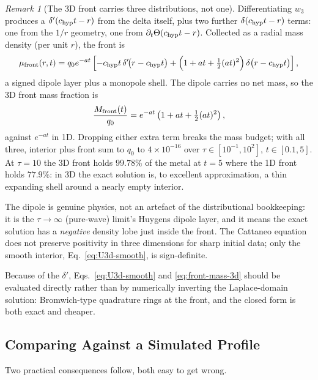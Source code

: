 \documentclass[11pt, a4paper, parskip]{scrartcl}
\theoremstyle{plain}
\theoremstyle{definition}
\theoremstyle{remark}
\newtheorem{remark}{Remark}
\newcommand{\chyp}{c_{\rm hyp}}                           %
\newcommand{\taurelax}{\tau}                              %
\begin{document}
\begin{remark}[The 3D front carries three distributions, not one]
Differentiating $w_3$ produces a $\delta'(\chyp t-r)$ from the delta
itself, plus two further $\delta(\chyp t-r)$ terms: one from the $1/r$
geometry, one from $\partial_t\Theta(\chyp t-r)$. Collected as a radial
mass density (per unit $r$), the front is
\begin{equation}
  \label{eq:front-measure-3d}
  \mu_{\rm front}(r,t) = q_0e^{-at}\left[
    -\chyp t\,\delta'\!\big(r-\chyp t\big)
    +\Big(1+at+\tfrac12(at)^2\Big)\,\delta\big(r-\chyp t\big)\right] ,
\end{equation}
a signed dipole layer plus a monopole shell. The dipole carries no net
mass, so the 3D front mass fraction is
\begin{equation}
  \label{eq:front-mass-3d}
  \frac{M_{\rm front}(t)}{q_0} = e^{-at}\left(1+at+\tfrac12(at)^2\right) ,
\end{equation}
against $e^{-at}$ in 1D. Dropping either extra term breaks the mass
budget; with all three, interior plus front sum to $q_0$ to
$4\times10^{-16}$ over $\taurelax\in[10^{-1},10^2]$, $t\in[0.1,5]$. At
$\taurelax=10$ the 3D front holds $99.78\%$ of the metal at $t=5$ where
the 1D front holds $77.9\%$: in 3D the exact solution is, to excellent
approximation, a thin expanding shell around a nearly empty interior.

The dipole is genuine physics, not an artefact of the distributional
bookkeeping: it is the $\taurelax\to\infty$ (pure-wave) limit's Huygens
dipole layer, and it means the exact solution has a \emph{negative}
density lobe just inside the front. The Cattaneo equation does not
preserve positivity in three dimensions for sharp initial data; only the
smooth interior, Eq.~\eqref{eq:U3d-smooth}, is sign-definite.
\end{remark}

Because of the $\delta'$, Eqs.~\eqref{eq:U3d-smooth} and
\eqref{eq:front-mass-3d} should be evaluated directly rather than by
numerically inverting the Laplace-domain solution: Bromwich-type
quadrature rings at the front, and the closed form is both exact and
cheaper.

\subsection{Comparing Against a Simulated Profile}
\label{sec:exact-comparison}

Two practical consequences follow, both easy to get wrong.
\end{document}
